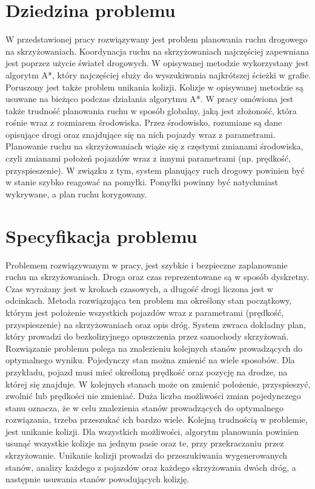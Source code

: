 
\section{Dziedzina problemu}

W przedstawionej pracy rozwiązywany jest problem planowania ruchu drogowego na skrzyżowaniach. Koordynacja ruchu na skrzyżowaniach najczęściej zapewniana jest poprzez użycie świateł drogowych. W opisywanej metodzie wykorzystany jest algorytm A*, który najczęściej służy do wyszukiwania najkrótszej ścieżki w grafie. Poruszony jest także problem unikania kolizji. Kolizje w opisywanej metodzie są usuwane na bieżąco podczas działania algorytmu A*.
\newline
\indent
W pracy omówiona jest także trudność planowania ruchu w sposób globalny, jaką jest złożoność, która rośnie wraz z rozmiarem środowiska. Przez środowisko, rozumiane są dane opisujące drogi oraz znajdujące się na nich pojazdy wraz z parametrami. Planowanie ruchu na skrzyżowaniach wiąże się z częstymi zmianami środowiska, czyli zmianami położeń pojazdów wraz z innymi parametrami (np. prędkość, przyspieszenie). W związku z tym, system planujący ruch drogowy powinien być w stanie szybko reagować na pomyłki. Pomyłki powinny być natychmiast wykrywane, a plan ruchu korygowany.

\section{Specyfikacja problemu}

Problemem rozwiązywanym w pracy, jest szybkie i bezpieczne zaplanowanie ruchu na skrzyżowaniach. Droga oraz czas reprezentowane są w sposób dyskretny. Czas wyrażany jest w krokach czasowych, a długość drogi liczona jest w odcinkach. Metoda rozwiązująca ten problem ma określony stan początkowy, którym jest położenie wszystkich pojazdów wraz z parametrami (prędkość, przyspieszenie) na skrzyżowaniach oraz opis dróg. System zwraca dokładny plan, który prowadzi do bezkolizyjnego opuszczenia przez samochody skrzyżowań. Rozwiązanie problemu polega na znalezieniu kolejnych stanów prowadzących do optymalnego wyniku. Pojedynczy stan można zmienić na wiele sposobów. Dla przykładu, pojazd musi mieć określoną prędkość oraz pozycję na drodze, na której się znajduje. W kolejnych stanach może on zmienić położenie, przyspieszyć, zwolnić lub prędkości nie zmieniać. Duża liczba możliwości zmian pojedynczego stanu oznacza, że w celu znalezienia stanów prowadzących do optymalnego rozwiązania, trzeba przeszukać ich bardzo wiele.
\newline
\indent
Kolejną trudnością w problemie, jest unikanie kolizji. Dla wszystkich możliwości, algorytm planowania powinien usunąć wszystkie kolizje na jednym pasie oraz te, przy przekraczaniu przez skrzyżowanie. Unikanie kolizji prowadzi do przeszukiwania wygenerowanych stanów, analizy każdego z pojazdów oraz każdego skrzyżowania dwóch dróg, a następnie usuwania stanów powodujących kolizję.

